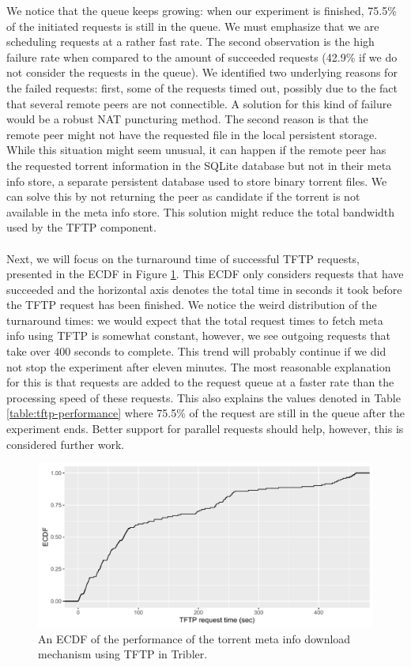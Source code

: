 We notice that the queue keeps growing: when our experiment is finished, 75.5\% of the initiated requests is still in the queue. We must emphasize that we are scheduling requests at a rather fast rate. The second observation is the high failure rate when compared to the amount of succeeded requests (42.9\% if we do not consider the requests in the queue). We identified two underlying reasons for the failed requests: first, some of the requests timed out, possibly due to the fact that several remote peers are not connectible. A solution for this kind of failure would be a robust NAT puncturing method. The second reason is that the remote peer might not have the requested file in the local persistent storage. While this situation might seem unusual, it can happen if the remote peer has the requested torrent information in the SQLite database but not in their meta info store, a separate persistent database used to store binary torrent files. We can solve this by not returning the peer as candidate if the torrent is not available in the meta info store. This solution might reduce the total bandwidth used by the TFTP component.\\\\
Next, we will focus on the turnaround time of successful TFTP requests, presented in the ECDF in Figure \ref{fig:tftp-performance-success}. This ECDF only considers requests that have succeeded and the horizontal axis denotes the total time in seconds it took before the TFTP request has been finished. We notice the weird distribution of the turnaround times: we would expect that the total request times to fetch meta info using TFTP is somewhat constant, however, we see outgoing requests that take over 400 seconds to complete. This trend will probably continue if we did not stop the experiment after eleven minutes. The most reasonable explanation for this is that requests are added to the request queue at a faster rate than the processing speed of these requests. This also explains the values denoted in Table \ref{table:tftp-performance} where 75.5\% of the request are still in the queue after the experiment ends. Better support for parallel requests should help, however, this is considered further work.

\begin{figure}[!h]
	\centering
	\includegraphics[width=1.0\columnwidth]{images/experiments/tftp_performance}
	\caption{An ECDF of the performance of the torrent meta info download mechanism using TFTP in Tribler.}
	\label{fig:tftp-performance-success}
\end{figure}

